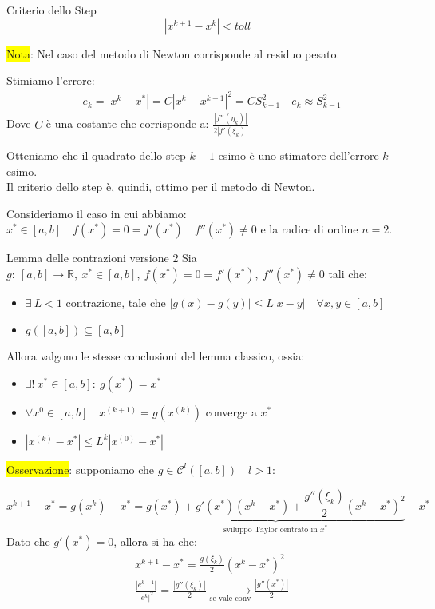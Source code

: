 \documentclass{article}
\begin{document}
\begin{theo}{Criterio dello Step}{}
    \[\left|x^{k+1}-x^k\right|<toll\]
\end{theo}

\colorbox{yellow}{Nota}: Nel caso del metodo di Newton corrisponde al residuo pesato.

Stimiamo l'errore:
\begin{align*}
    &e_k=\left|x^k-x^*\right|=C\left|x^k-x^{k-1}\right|^2=CS^2_{k-1}\quad e_k\approx S^2_{k-1}
\end{align*}
Dove $C$ è una costante che corrisponde a: \large$\frac{\left|f''(\eta_k)\right|}{2\left|f'(\xi_k)\right|}$\normalsize

Otteniamo che il quadrato dello step $k-1$-esimo è uno stimatore dell'errore $k$-esimo.\\
Il criterio dello step è, quindi, ottimo per il metodo di Newton.

Consideriamo il caso in cui abbiamo: $x^*\in[a,b]\quad f(x^*)=0=f'(x^*)\quad f''(x^*)\ne0$ e la radice di ordine $n=2$.
\begin{theo}{Lemma delle contrazioni versione 2}{}
    Sia $g:\ [a,b]\to\mathbb R,\ x^*\in[a,b],\ f(x^*)=0=f'(x^*),\ f''(x^*)\ne0$ tali che:
    \begin{itemize}
        \item $\exists\ L<1$ contrazione, tale che $\left|g(x)-g(y)\right|\le L\left|x-y\right|\quad\forall x,y\in[a,b]$
        \item $g([a,b])\subseteq [a,b]$\\
    \end{itemize}

    Allora valgono le stesse conclusioni del lemma classico, ossia:
    \begin{itemize}
        \item $\exists!\ x^*\in[a,b]:\ g(x^*)=x^*$
        \item $\forall x^0\in[a,b]\quad x^{(k+1)}=g\left(x^{(k)}\right)$ converge a $x^*$
        \item $\left|x^{(k)}-x^*\right|\le L^k\left|x^{(0)}-x^*\right|$
    \end{itemize}
\end{theo}
\colorbox{yellow}{Osservazione}: supponiamo che $g\in\mathcal{C}^l\left([a,b]\right)\quad l>1$:

\[x^{k+1}-x^*=g\left(x^k\right)-x^*=\underbrace{g\left(x^*\right)+g'(x^*)\left(x^k-x^*\right)+\frac{g''\left(\xi_k\right)}{2}\left(x^k-x^*\right)^2}_{\text{sviluppo Taylor centrato in } x^*}-x^*\]
Dato che $g'(x^*)=0$, allora si ha che:
\begin{align*}
    &x^{k+1}-x^*=\frac{g\left(\xi_k\right)}{2}\left(x^k-x^*\right)^2\\
    &\boxed{\frac{\left|e^{k+1}\right|}{\left|e^k\right|^2}=\frac{\left|g''\left(\xi_k\right)\right|}{2}\underset{\text{se vale conv}}{\longrightarrow}\frac{\left|g''\left(x^*\right)\right|}{2}}
\end{align*}
\end{document}
